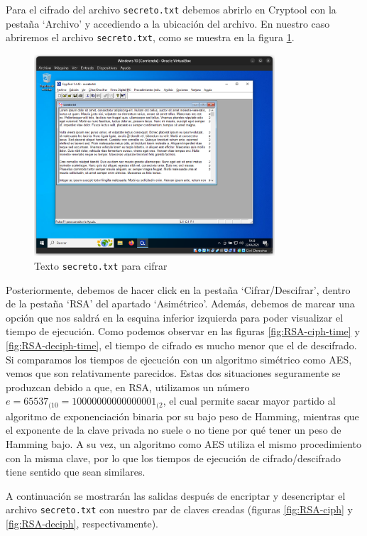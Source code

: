 Para el cifrado del archivo \texttt{secreto.txt} debemos abrirlo en Cryptool con la pestaña `Archivo' y accediendo a la ubicación del archivo. En nuestro caso abriremos el archivo \texttt{secreto.txt}, como se muestra en la figura \ref{fig:RSA-secreto}.

\begin{figure}[H]
    \centering
    \includegraphics[width=0.8\textwidth]{EncriptadoRSA-1}
    \caption{Texto \texttt{secreto.txt} para cifrar}
    \label{fig:RSA-secreto}
\end{figure}

Posteriormente, debemos de hacer click en la pestaña `Cifrar/Descifrar', dentro de la pestaña `RSA' del apartado `Asimétrico'. Además, debemos de marcar una opción que nos saldrá en la esquina inferior izquierda para poder visualizar el tiempo de ejecución.
Como podemos observar en las figuras \ref{fig:RSA-ciph-time} y \ref{fig:RSA-deciph-time}, el tiempo de cifrado es mucho menor que el de descifrado. Si comparamos los tiempos de ejecución con un algoritmo simétrico como AES, vemos que son relativamente parecidos. Estas dos situaciones seguramente se produzcan debido a que, en RSA, utilizamos un número $e = 65537_{(10} = 10000000000000001_{(2}$, el cual permite sacar mayor partido al algoritmo de exponenciación binaria por su bajo peso de Hamming, mientras que el exponente de la clave privada no suele o no tiene por qué tener un peso de Hamming bajo.
A su vez, un algoritmo como AES utiliza el mismo procedimiento con la misma clave, por lo que los tiempos de ejecución de cifrado/descifrado tiene sentido que sean similares.

A continuación se mostrarán las salidas después de encriptar y desencriptar el archivo \texttt{secreto.txt} con nuestro par de claves creadas (figuras \ref{fig:RSA-ciph} y \ref{fig:RSA-deciph}, respectivamente).

